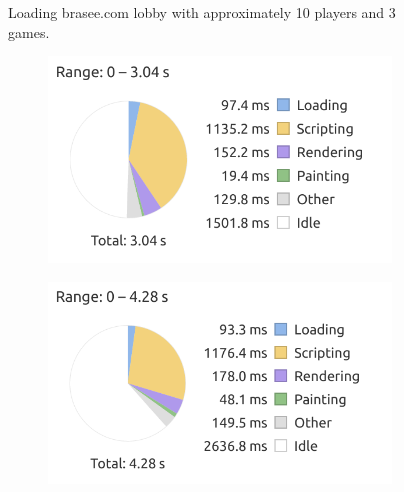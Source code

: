 \begin{figure}[H]
\begin{subfigure}{0.5\textwidth}
    \end{subfigure}
    
    \caption{Loading brasee.com lobby with approximately 10 players and 3 games.}
\end{figure}

\begin{figure}[H]
    \centering
    \begin{subfigure}{0.49\textwidth}
        \includegraphics[width=\textwidth]{figure/clientsidePerformance/ligraph1.png}
    \end{subfigure}
    \begin{subfigure}{0.49\textwidth}
        \includegraphics[width=\textwidth]{figure/clientsidePerformance/ligraph2.png}
    \end{subfigure}
    \\
    \begin{subfigure}{0.5\textwidth}

\end{subfigure}
\end{figure}
